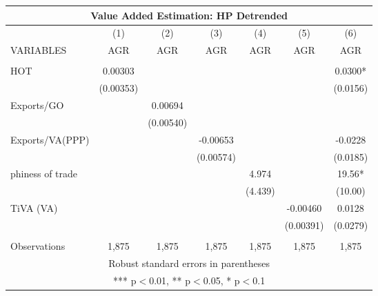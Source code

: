 \documentclass[]{article}
\begin{document}
\begin{tabular}{lcccccc}
\multicolumn{7}{c}{Value Added Estimation: HP Detrended} \\ \hline
 & (1) & (2) & (3) & (4) & (5) & (6) \\
VARIABLES & AGR & AGR & AGR & AGR & AGR & AGR \\ \hline
 &  &  &  &  &  &  \\
HOT & 0.00303 &  &  &  &  & 0.0300* \\
 & (0.00353) &  &  &  &  & (0.0156) \\
Exports/GO &  & 0.00694 &  &  &  &  \\
 &  & (0.00540) &  &  &  &  \\
Exports/VA(PPP) &  &  & -0.00653 &  &  & -0.0228 \\
 &  &  & (0.00574) &  &  & (0.0185) \\
phiness of trade &  &  &  & 4.974 &  & 19.56* \\
 &  &  &  & (4.439) &  & (10.00) \\
TiVA (VA) &  &  &  &  & -0.00460 & 0.0128 \\
 &  &  &  &  & (0.00391) & (0.0279) \\
 &  &  &  &  &  &  \\
 Observations & 1,875 & 1,875 & 1,875 & 1,875 & 1,875 & 1,875 \\ \hline
\multicolumn{7}{c}{ Robust standard errors in parentheses} \\
\multicolumn{7}{c}{ *** p$<$0.01, ** p$<$0.05, * p$<$0.1} \\
\end{tabular}
\end{document}
